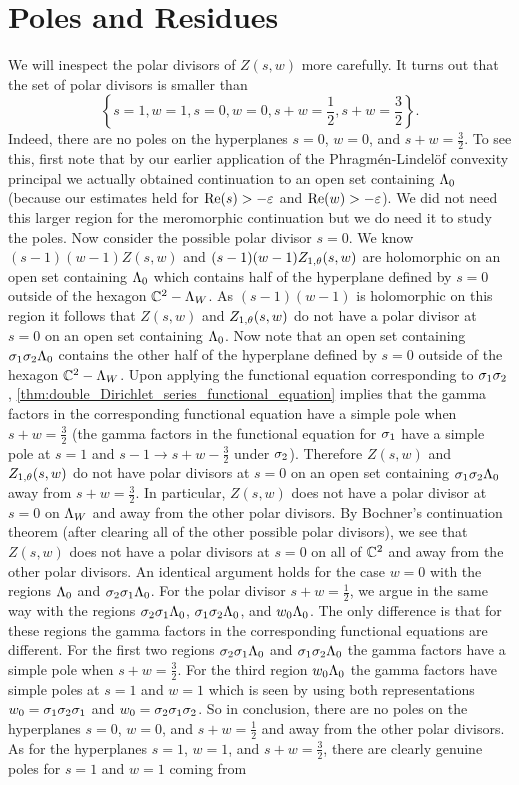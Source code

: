 \documentclass[12pt,reqno,oneside]{amsart}
\begin{document}
\section{Poles and Residues}
    We will inespect the polar divisors of $Z(s,w)$ more carefully. It turns out that the set of polar divisors is smaller than
    \[
        \left\{s = 1, w = 1, s = 0, w = 0, s+w = \frac{1}{2}, s+w = \frac{3}{2}\right\}.
    \]
    Indeed, there are no poles on the hyperplanes $s = 0$, $w = 0$, and $s+w = \frac{3}{2}$. To see this, first note that by our earlier application of the Phragm\'en-Lindel\"of convexity principal we actually obtained continuation to an open set containing $\Lambda_{0}$ (because our estimates held for $\mathrm{Re}(s) > -\varepsilon$ and $\mathrm{Re}(w) > -\varepsilon$). We did not need this larger region for the meromorphic continuation but we do need it to study the poles. Now consider the possible polar divisor $s = 0$. We know $(s-1)(w-1)Z(s,w)$ and $(s-1)(w-1)Z_{1,\theta}(s,w)$ are holomorphic on an open set containing $\Lambda_{0}$ which contains half of the hyperplane defined by $s = 0$ outside of the hexagon $\mathbb{C}^{2}-\Lambda_{W}$. As $(s-1)(w-1)$ is holomorphic on this region it follows that $Z(s,w)$ and $Z_{1,\theta}(s,w)$ do not have a polar divisor at $s = 0$ on an open set containing $\Lambda_{0}$. Now note that an open set containing $\sigma_{1}\sigma_{2}\Lambda_{0}$ contains the other half of the hyperplane defined by $s = 0$ outside of the hexagon $\mathbb{C}^{2}-\Lambda_{W}$. Upon applying the functional equation corresponding to $\sigma_{1}\sigma_{2}$, \cref{thm:double_Dirichlet_series_functional_equation} implies that the gamma factors in the corresponding functional equation have a simple pole when $s+w = \frac{3}{2}$ (the gamma factors in the functional equation for $\sigma_{1}$ have a simple pole at $s = 1$ and $s-1 \to s+w-\frac{3}{2}$ under $\sigma_{2}$). Therefore $Z(s,w)$ and $Z_{1,\theta}(s,w)$ do not have polar divisors at $s = 0$ on an open set containing $\sigma_{1}\sigma_{2}\Lambda_{0}$ away from $s+w = \frac{3}{2}$. In particular, $Z(s,w)$ does not have a polar divisor at $s = 0$ on $\Lambda_{W}$ and away from the other polar divisors. By Bochner's continuation theorem (after clearing all of the other possible polar divisors), we see that $Z(s,w)$ does not have a polar divisors at $s = 0$ on all of $\mathbb{C}^{2}$ and away from the other polar divisors. An identical argument holds for the case $w = 0$ with the regions $\Lambda_{0}$ and $\sigma_{2}\sigma_{1}\Lambda_{0}$. For the polar divisor $s+w = \frac{1}{2}$, we argue in the same way with the regions $\sigma_{2}\sigma_{1}\Lambda_{0}$, $\sigma_{1}\sigma_{2}\Lambda_{0}$, and $w_{0}\Lambda_{0}$. The only difference is that for these regions the gamma factors in the corresponding functional equations are different. For the first two regions $\sigma_{2}\sigma_{1}\Lambda_{0}$ and $\sigma_{1}\sigma_{2}\Lambda_{0}$ the gamma factors have a simple pole when $s+w = \frac{3}{2}$. For the third region $w_{0}\Lambda_{0}$ the gamma factors have simple poles at $s = 1$ and $w = 1$ which is seen by using both representations $w_{0} = \sigma_{1}\sigma_{2}\sigma_{1}$ and $w_{0} = \sigma_{2}\sigma_{1}\sigma_{2}$. So in conclusion, there are no poles on the hyperplanes $s = 0$, $w = 0$, and $s+w = \frac{1}{2}$ and away from the other polar divisors. As for the hyperplanes $s = 1$, $w = 1$, and $s+w = \frac{3}{2}$, there are clearly genuine poles for $s = 1$ and $w = 1$ coming from 
\end{document}
